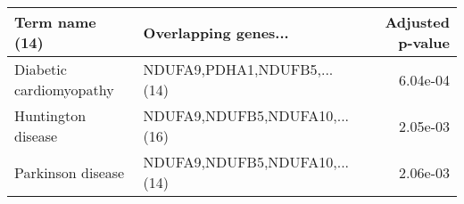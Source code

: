 \begin{tabular}{llr}
\toprule
         Term name (14) &          Overlapping genes... &  Adjusted p-value \\
\midrule
Diabetic cardiomyopathy &   NDUFA9,PDHA1,NDUFB5,...(14) &          6.04e-04 \\
     Huntington disease & NDUFA9,NDUFB5,NDUFA10,...(16) &          2.05e-03 \\
      Parkinson disease & NDUFA9,NDUFB5,NDUFA10,...(14) &          2.06e-03 \\
\bottomrule
\end{tabular}
